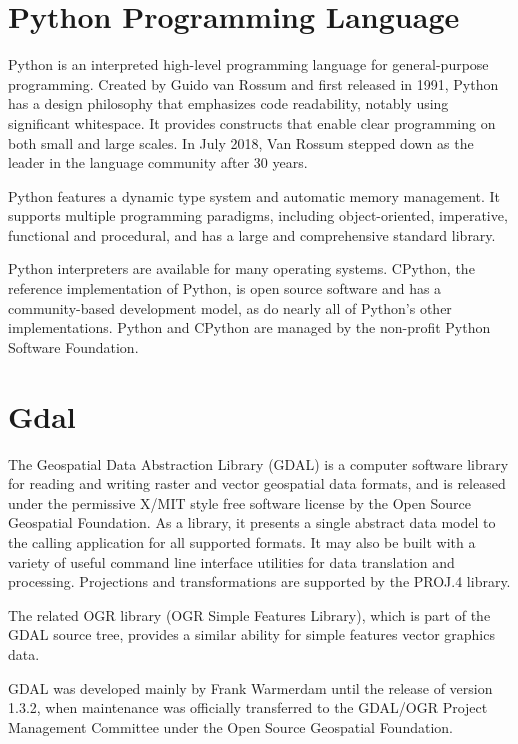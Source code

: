 \documentclass[12pt, a4paper]{report}
\begin{document}
\newpage{}

\section{Python Programming Language}

Python is an interpreted high-level programming language for general-purpose programming. Created by Guido van Rossum and first released in 1991, Python has a design philosophy that emphasizes code readability, notably using significant whitespace. It provides constructs that enable clear programming on both small and large scales. In July 2018, Van Rossum stepped down as the leader in the language community after 30 years.


Python features a dynamic type system and automatic memory management. It supports multiple programming paradigms, including object-oriented, imperative, functional and procedural, and has a large and comprehensive standard library.


Python interpreters are available for many operating systems. CPython, the reference implementation of Python, is open source software and has a community-based development model, as do nearly all of Python's other implementations. Python and CPython are managed by the non-profit Python Software Foundation. 


\newpage{}

\section{Gdal} 

	The Geospatial Data Abstraction Library (GDAL) is a computer software library for reading and writing raster and vector geospatial data formats, and is released under the permissive X/MIT style free software license by the Open Source Geospatial Foundation. As a library, it presents a single abstract data model to the calling application for all supported formats. It may also be built with a variety of useful command line interface utilities for data translation and processing. Projections and transformations are supported by the PROJ.4 library.

	The related OGR library (OGR Simple Features Library), which is part of the GDAL source tree, provides a similar ability for simple features vector graphics data.

	GDAL was developed mainly by Frank Warmerdam until the release of version 1.3.2, when maintenance was officially transferred to the GDAL/OGR Project Management Committee under the Open Source Geospatial Foundation.
\end{document}
